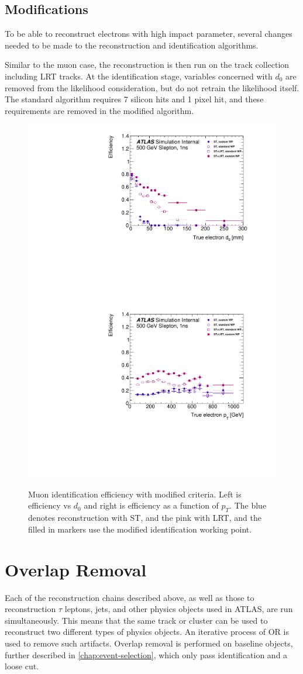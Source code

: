 \subsection{Modifications}
\label{sec:el_reco_mods}
To be able to reconstruct electrons with high impact parameter, several changes needed to be made to the reconstruction and identification algorithms. 

Similar to the muon case, the reconstruction is then run on the track collection including \ac{LRT} tracks. At the identification stage, variables concerned with $d_{0}$ are removed from the likelihood consideration, but do not retrain the likelihood itself. The standard algorithm requires 7 silicon hits and 1 pixel hit, and these requirements are removed in the modified algorithm. 

\begin{figure}[htbp]
\centering
\includegraphics[width=.48\textwidth]{figures/EventReconstruction/wp_e_d0_all_wip.pdf}
\includegraphics[width=.48\textwidth]{figures/EventReconstruction/wp_e_pt_all_wip.pdf}
\caption{Muon identification efficiency with modified criteria. Left is efficiency vs $d_{0}$ and right is efficiency as a function of $p_{T}$. The blue denotes reconstruction with \ac{ST}, and the pink with \ac{LRT}, and the filled in markers use the modified identification working point.}
\label{fig:cust_elec_eff}
\end{figure}

\section{Overlap Removal}
Each of the reconstruction chains described above, as well as those to reconstruction $\tau$ leptons, jets, and other physics objects used in \ac{ATLAS}, are run simultaneously. This means that the same track or cluster can be used to reconstruct two different types of physics objects. An iterative process of \ac{OR} is used to remove such artifacts. Overlap removal is performed on baseline objects, further described in \autoref{chap:event-selection}, which only pass identification and a loose \pt cut. 

